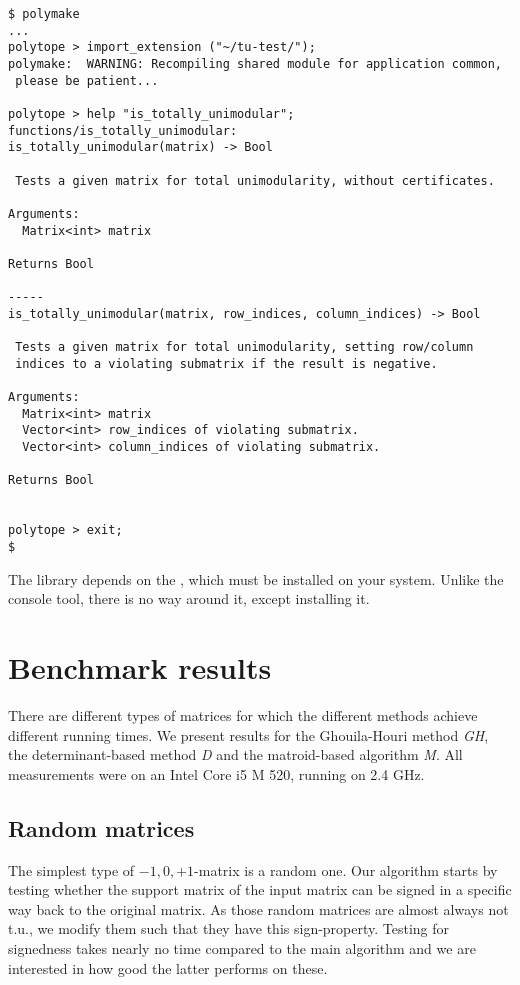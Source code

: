 \documentclass[12pt]{article}
\begin{document}
{\tiny
{}
\begin{lstlisting}
$ polymake 
...
polytope > import_extension ("~/tu-test/");
polymake:  WARNING: Recompiling shared module for application common,
 please be patient...

polytope > help "is_totally_unimodular";
functions/is_totally_unimodular:
is_totally_unimodular(matrix) -> Bool

 Tests a given matrix for total unimodularity, without certificates.

Arguments:
  Matrix<int> matrix 

Returns Bool 

-----
is_totally_unimodular(matrix, row_indices, column_indices) -> Bool

 Tests a given matrix for total unimodularity, setting row/column
 indices to a violating submatrix if the result is negative.

Arguments:
  Matrix<int> matrix 
  Vector<int> row_indices of violating submatrix.
  Vector<int> column_indices of violating submatrix.

Returns Bool 


polytope > exit;
$
\end{lstlisting}}

The library depends on the \cite{Boost}, which must be installed on your system.
Unlike the console tool, there is no way around it, except installing it.

\newpage

\section{Benchmark results}

There are different types of matrices for which the different methods achieve different running times. We present results for the Ghouila-Houri method {\em GH}, the
determinant-based method {\em D} and the matroid-based algorithm {\em M}. All measurements were on an Intel Core i5 M 520, running on 2.4 GHz.

\subsection{Random matrices}

The simplest type of $-1,0,+1$-matrix is a random one.
Our algorithm starts by testing whether the support matrix of the input matrix can be signed in a specific way back to the original matrix.
As those random matrices are almost always not t.u., we modify them such that they have this sign-property.
Testing for signedness takes nearly no time compared to the main algorithm and we are interested in how good the latter performs on these.
\end{document}
